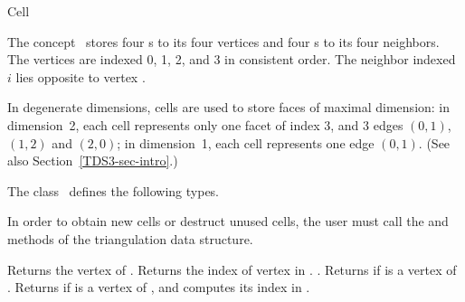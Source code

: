 

\begin{ccRefConcept}[TriangulationDataStructure_3::]{Cell}


\ccDefinition
  
The concept \ccRefName\ stores
four s to its four vertices and four s
to its four neighbors. The vertices are indexed 0, 1, 2, and 3 in consistent
order.  The neighbor indexed $i$ lies opposite to vertex .

In degenerate dimensions, cells are used to store faces of maximal
dimension: in dimension~2, each cell represents only one
facet of index 3, and 3 edges $(0,1)$, $(1,2)$ and $(2,0)$; in
dimension~1, each cell represents one edge $(0,1)$. (See also
Section~\ref{TDS3-sec-intro}.) 

\ccTypes
{}
\ccThreeToTwo
The class \ccRefName\ defines the following types.

\ccGlue
{}
\ccGlue
{}

\ccCreation
{}  %

In order to obtain new cells or destruct unused cells, the user must call the
 and  methods of the triangulation data
structure.

\ccOperations

\ccAccessFunctions

{Returns the vertex  of \ccVar.
}
\ccGlue
{}
{Returns the index of vertex  in \ccVar.
.}
\ccGlue
{}
{Returns  if   is a vertex of \ccVar.}
\ccGlue
{}
{Returns  if  is a vertex of \ccVar, and
computes its index  in \ccVar.}


\end{ccRefConcept}
